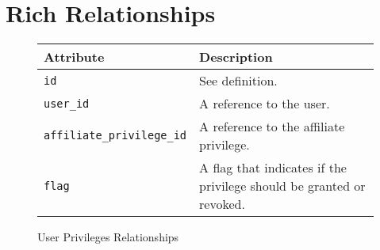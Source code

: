 \section{Rich Relationships}

\begin{figure}[htb]
\begin{center}
\begin{tabular}{ | l | p{8cm} | }
  \hline
    \textbf{Attribute} & \textbf{Description} \\ \hline
    \verb+id+ & See definition.\\ \hline
    \verb+user_id+ & A reference to the user.\\ \hline
    \verb+affiliate_privilege_id+ & A reference to the affiliate privilege.\\ \hline
    \verb+flag+ & A flag that indicates if the privilege should be granted or revoked.\\ \hline
\end{tabular}
\caption{User Privileges Relationships}
\label{tab:user_privileges_relationships}
\end{center}
\end{figure}